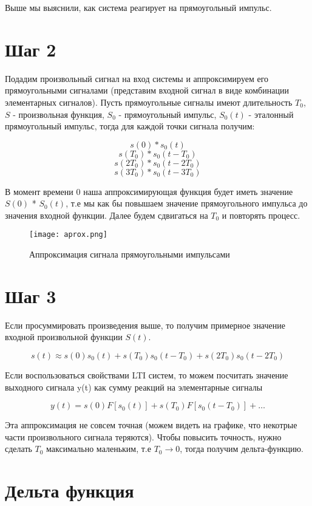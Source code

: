 Выше мы выяснили, как система реагирует на прямоугольный импульс.

\section*{Шаг 2}

Подадим произвольный сигнал на вход системы и аппроксимируем его прямоугольными сигналами (представим входной сигнал в виде комбинации элементарных сигналов).
Пусть прямоугольные сигналы имеют длительность $T_0$, $S$ - произвольная функция, $S_0$ - прямоугольный импульс, $S_0(t)$ - эталонный прямоугольный импульс, тогда
для каждой точки сигнала получим:

\[
s(0) * s_0(t)
\]
\[
s(T_0) * s_0(t - T_0)
\]
\[
s(2T_0) * s_0(t - 2T_0)
\]
\[
s(3T_0) * s_0(t - 3T_0)
\]

В момент времени 0 наша аппроксимирующая функция будет иметь значение $S(0)$ * $S_0(t)$, т.е мы как бы повышаем значение прямоугольного импульса до значения 
входной функции. Далее будем сдвигаться на $T_0$ и повторять процесс.

\begin{figure}[H]
    \centering
    \texttt{[image: aprox.png]}
    \caption{Аппроксимация сигнала прямоугольными импульсами}
\end{figure}

\section*{Шаг 3}

Если просуммировать произведения выше, то получим примерное значение входной произвольной функции $S(t)$.

\[
s(t) \approx s(0) s_0(t) + s(T_0) s_0(t - T_0) + s(2T_0) s_0(t - 2T_0)
\]

Если воспользоваться свойствами LTI систем, то можем посчитать значение выходного сигнала y(t) как сумму реакций на элементарные сигналы

\[
y(t) = s(0) F[s_0(t)] + s(T_0) F[s_0(t - T_0)] + \ldots
\]

Эта аппроксимация не совсем точная (можем видеть на графике, что некотрые части произвольного сигнала теряются). Чтобы повысить
точность, нужно сделать $T_0$ максимально маленьким, т.е $T_0 \to 0$, тогда получим дельта-функцию.

\section*{Дельта функция}

